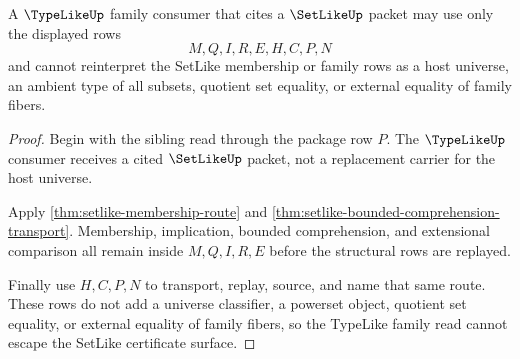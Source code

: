 \begin{theorem}
\label{thm:setlike-typelike-family-nonescape}
A $\TypeLikeUp$ family consumer that cites a $\SetLikeUp$ packet may use only the displayed rows
$$
M,Q,I,R,E,H,C,P,N
$$
and cannot reinterpret the SetLike membership or family rows as a host universe, an ambient type of all subsets, quotient set equality, or external equality of family fibers.
\end{theorem}
\begin{proof}
Begin with the sibling read through the package row $P$. The $\TypeLikeUp$ consumer receives a cited $\SetLikeUp$ packet, not a replacement carrier for the host universe.

Apply \autoref{thm:setlike-membership-route} and \autoref{thm:setlike-bounded-comprehension-transport}. Membership, implication, bounded comprehension, and extensional comparison all remain inside $M,Q,I,R,E$ before the structural rows are replayed.

Finally use $H,C,P,N$ to transport, replay, source, and name that same route. These rows do not add a universe classifier, a powerset object, quotient set equality, or external equality of family fibers, so the TypeLike family read cannot escape the SetLike certificate surface.
\end{proof}

